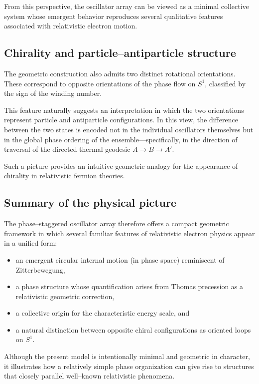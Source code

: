 \documentclass[%
 reprint, amsmath,amssymb, aps, prb, ]{revtex4-2}
\numberwithin{equation}{section}
\begin{document}
From this perspective, the oscillator array can be viewed as a minimal collective system whose emergent behavior reproduces several qualitative features associated with relativistic electron motion.

\subsection{Chirality and particle--antiparticle structure}

The geometric construction also admits two distinct rotational orientations. These correspond to opposite orientations of the phase flow on $S^1$, classified by the sign of the winding number.

This feature naturally suggests an interpretation in which the two orientations represent particle and antiparticle configurations. In this view, the difference between the two states is encoded not in the individual oscillators themselves but in the global phase ordering of the ensemble---specifically, in the direction of traversal of the directed thermal geodesic $A\to B\to A'$.

Such a picture provides an intuitive geometric analogy for the appearance of chirality in relativistic fermion theories.

\subsection{Summary of the physical picture}

The phase--staggered oscillator array therefore offers a compact geometric framework in which several familiar features of relativistic electron physics appear in a unified form:

\begin{itemize}
\item an emergent circular internal motion (in phase space) reminiscent of Zitterbewegung,
\item a phase structure whose quantification arises from Thomas precession as a relativistic geometric correction,
\item a collective origin for the characteristic energy scale, and
\item a natural distinction between opposite chiral configurations as oriented loops on $S^1$.
\end{itemize}

Although the present model is intentionally minimal and geometric in character, it illustrates how a relatively simple phase organization can give rise to structures that closely parallel well--known relativistic phenomena.
\end{document}
